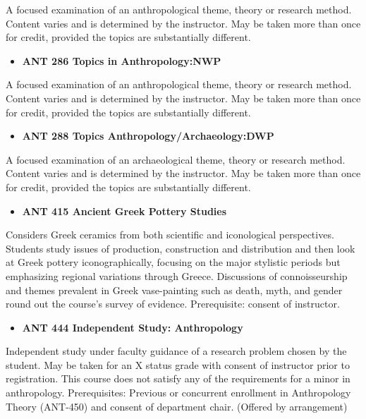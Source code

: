 \documentclass[
  letterpaper,
]{scrbook}
\providecommand{\tightlist}{%
  \setlength{\itemsep}{0pt}\setlength{\parskip}{0pt}}
\begin{document}
A focused examination of an anthropological theme, theory or research
method. Content varies and is determined by the instructor. May be taken
more than once for credit, provided the topics are substantially
different.

\begin{itemize}
\tightlist
\item
  \textbf{ANT 286 Topics in Anthropology:NWP}
\end{itemize}

A focused examination of an anthropological theme, theory or research
method. Content varies and is determined by the instructor. May be taken
more than once for credit, provided the topics are substantially
different.

\begin{itemize}
\tightlist
\item
  \textbf{ANT 288 Topics Anthropology/Archaeology:DWP}
\end{itemize}

A focused examination of an archaeological theme, theory or research
method. Content varies and is determined by the instructor. May be taken
more than once for credit, provided the topics are substantially
different.

\begin{itemize}
\tightlist
\item
  \textbf{ANT 415 Ancient Greek Pottery Studies}
\end{itemize}

Considers Greek ceramics from both scientific and iconological
perspectives. Students study issues of production, construction and
distribution and then look at Greek pottery iconographically, focusing
on the major stylistic periods but emphasizing regional variations
through Greece. Discussions of connoisseurship and themes prevalent in
Greek vase-painting such as death, myth, and gender round out the
course's survey of evidence. Prerequisite: consent of instructor.

\begin{itemize}
\tightlist
\item
  \textbf{ANT 444 Independent Study: Anthropology}
\end{itemize}

Independent study under faculty guidance of a research problem chosen by
the student. May be taken for an X status grade with consent of
instructor prior to registration. This course does not satisfy any of
the requirements for a minor in anthropology. Prerequisites: Previous or
concurrent enrollment in Anthropology Theory (ANT-450) and consent of
department chair. (Offered by arrangement)
\end{document}
